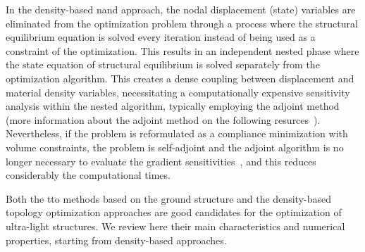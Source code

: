 In the density-based \acrfull{nand} approach, the nodal displacement (state) variables are eliminated from the optimization problem through a process where the structural equilibrium equation is solved every iteration instead of being used as a constraint of the optimization. This results in an independent nested phase where the state equation of structural equilibrium is solved separately from the optimization algorithm. This creates a dense coupling between displacement and material density variables, necessitating a computationally expensive sensitivity analysis within the nested algorithm, typically employing the adjoint method (more information about the adjoint method on the following resurces~). Nevertheless, if the problem is reformulated as a compliance minimization with volume constraints, the problem is self-adjoint and the adjoint algorithm is no longer necessary to evaluate the gradient sensitivities~, and this reduces considerably the computational times.

Both the \gls{tto} methods based on the ground structure and the density-based topology optimization approaches are good candidates for the optimization of ultra-light structures. We review here their main characteristics and numerical properties, starting from density-based approaches.


